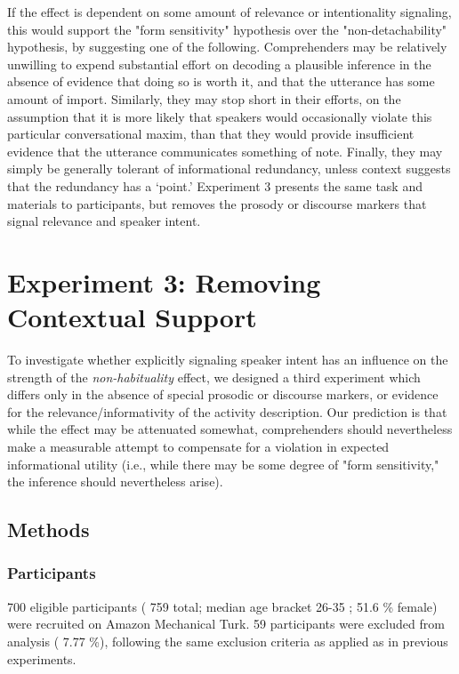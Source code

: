 \documentclass{sp}\usepackage[]{graphicx}\usepackage[]{color}
\begin{document}
If the effect is dependent on some amount of relevance or intentionality signaling, this would support the "form sensitivity" hypothesis over the "non-detachability" hypothesis, by suggesting one of the following. Comprehenders may be relatively unwilling to expend substantial effort on decoding a plausible inference in the absence of evidence that doing so is worth it, and that the utterance has some amount of import. Similarly, they may stop short in their efforts, on the assumption that it is more likely that speakers would occasionally violate this particular conversational maxim, than that they would provide insufficient evidence that the utterance communicates something of note. Finally, they may simply be generally tolerant of informational redundancy, unless context suggests that the redundancy has a `point.' Experiment 3 presents the same task and materials to participants, but removes the prosody or discourse markers that signal relevance and speaker intent.

\section{Experiment 3: Removing Contextual Support}\label{exp3}



To investigate whether explicitly signaling speaker intent has an influence on the strength of the \textit{non-habituality} effect, we designed a third experiment which differs only in the absence of special prosodic or discourse markers, or evidence for the relevance/informativity of the activity description. Our prediction is that while the effect may be attenuated somewhat, comprehenders should nevertheless make a measurable attempt to compensate for a violation in expected informational utility (i.e., while there may be some degree of "form sensitivity," the inference should nevertheless arise).

\subsection{Methods}

\subsubsection{Participants}

700 eligible participants (%
759
 total; median age bracket %
26-35
; %
51.6
\% female) were recruited on Amazon Mechanical Turk. %
59
 participants were excluded from analysis (%
7.77
\%), following the same exclusion criteria as applied as in previous experiments.
\end{document}
